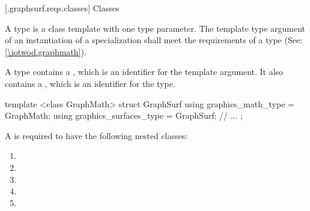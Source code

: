 
 [\iotwod.graphsurf.reqs.classes] {Classes}

\pnum
A \graphicssurfacestemplparam type is a class template with one type parameter. The template type argument of an instantiation of a \graphicssurfacestemplparam specialization shall meet the requirements of a \graphicsmathtemplparam type (See: \ref{\iotwod.graphmath}).

\pnum
A \graphicssurfacestemplparam type contains a  , which is an identifier for the template argument. It also contains a  , which is an identifier for the \graphicssurfacestemplparam type.

\pnum
\begin{example}
\begin{codeblock}
template <class GraphMath>
struct GraphSurf {
  using graphics_math_type = GraphMath;
  using graphics_surfaces_type = GraphSurf;
  // ...
};
\end{codeblock}
\end{example}

\pnum
A \graphicssurfacestemplparam is required to have the following  nested classes:

\begin{enumerate}
\item {}
\item {}
\item {}
\item {}
\item {}
\end{enumerate}
